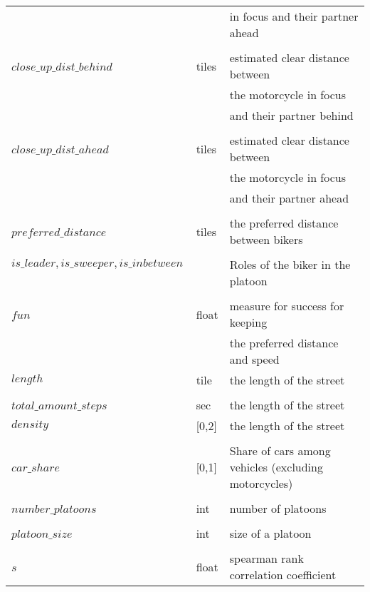 \begin{center}
\begin{longtable}{@{}l l p{10cm}@{}}
&&in focus and their partner ahead\\
\\$close\_up\_dist\_behind$\ & tiles & estimated clear distance between\\
&&the motorcycle in focus\\
&&and their partner behind\\
\\$close\_up\_dist\_ahead$\ & tiles & estimated clear distance between\\
&&the motorcycle in focus\\
&&and their partner ahead\\
\\$preferred\_distance$\ & tiles & the preferred distance between bikers\\
\\$is\_leader, is\_sweeper, is\_inbetween$\ &  & Roles of the biker in the platoon\\
\\$fun$\ & float & measure for success for keeping\\
&&the preferred distance and speed\\
\(length\) & tile & the length of the street\\
\\$total\_amount\_steps$\ & sec & the length of the street\\
\(density\) & [0,2] & the length of the street\\
\\$car\_share$\ & [0,1] & Share of cars among vehicles (excluding motorcycles)\\
\\$number\_platoons$\ & int & number of platoons\\
\\$platoon\_size$\ & int & size of a platoon\\
\\$s$\ & float & spearman rank correlation coefficient\\

\end{longtable}
\end{center}